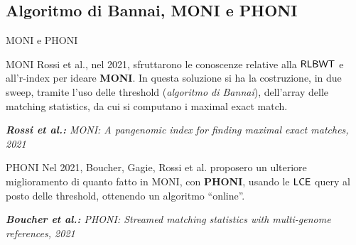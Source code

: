 \documentclass[]{beamer}
\def\LCE{\mbox{\rm {\sf LCE}}}
\def\RLBWT{\mbox{\rm {\sf RLBWT}}}
\def\LCE{\mbox{\rm {\sf LCE}}}
\begin{document}
\subsection{Algoritmo di Bannai, MONI e PHONI}
\begin{frame}{MONI e PHONI}
  \begin{block}{MONI}
    \small
    Rossi et al., nel 2021, sfruttarono le conoscenze relative
    alla $\RLBWT$ e all'r-index 
    per ideare \textbf{MONI}. In questa soluzione si ha la costruzione, in due
    sweep, tramite l'uso delle threshold (\textit{algoritmo di
      Bannai}), dell'array delle matching statistics, da cui si computano i
    maximal exact match. 
  \end{block}
  \begin{alertblock}{}
    \footnotesize{\textit{\textbf{Rossi et al.:}
        MONI: A pangenomic index for finding maximal exact matches, 2021}}
  \end{alertblock}
  \begin{block}{PHONI}
    \small
    Nel 2021, Boucher, Gagie, Rossi et al. proposero un ulteriore miglioramento di
    quanto fatto in MONI, con \textbf{PHONI}, usando le
    $\LCE$ query 
    al posto delle threshold, ottenendo un algoritmo ``online''.
  \end{block}
  \begin{alertblock}{}
    \footnotesize{\textit{\textbf{Boucher et al.:}
        PHONI: Streamed matching statistics with multi-genome references, 2021}}
  \end{alertblock}
\end{frame}
\end{document}

